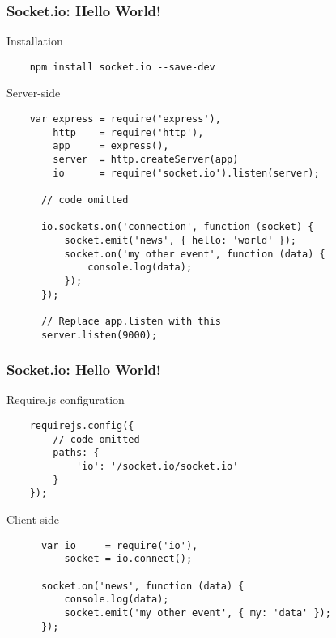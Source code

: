 \begin{frame}[fragile]
  \frametitle{Socket.io: Hello World!}

  \begin{block}{Installation}
    {\tiny
    \begin{verbatim}
    npm install socket.io --save-dev
    \end{verbatim}
    }
  \end{block}

  \pause

  \begin{block}{Server-side}
    {\tiny
    \begin{verbatim} 
    var express = require('express'),
        http    = require('http'),
        app     = express(),
        server  = http.createServer(app)
        io      = require('socket.io').listen(server);
      
      // code omitted
      
      io.sockets.on('connection', function (socket) {
          socket.emit('news', { hello: 'world' });
          socket.on('my other event', function (data) {
              console.log(data);
          });
      });

      // Replace app.listen with this
      server.listen(9000);
    \end{verbatim} 
    }
  \end{block}
\end{frame}

\begin{frame}[fragile]
  \frametitle{Socket.io: Hello World!}

  \begin{block}{Require.js configuration}
    {\tiny
    \begin{verbatim}
    requirejs.config({
        // code omitted
        paths: {
            'io': '/socket.io/socket.io'
        }
    });
    \end{verbatim}
    }
  \end{block}

  \pause

  \begin{block}{Client-side}
    {\tiny
    \begin{verbatim}
      var io     = require('io'),
          socket = io.connect();

      socket.on('news', function (data) {
          console.log(data);
          socket.emit('my other event', { my: 'data' });
      });
    \end{verbatim}
    }
  \end{block}
\end{frame}

